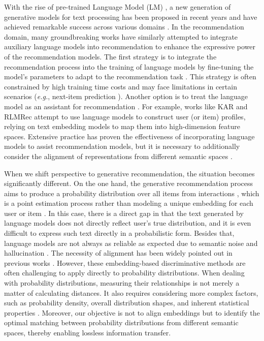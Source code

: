 \documentclass[sigconf]{acmart}
\begin{document}
With the rise of pre-trained Language Model (LM) \cite{touvron2023llama, zhao2023survey}, a new generation of generative models for text processing has been proposed in recent years and have achieved remarkable success across various domains \cite{chang2024survey}. In the recommendation domain, many groundbreaking works have similarly attempted to integrate auxiliary language models into recommendation to enhance the expressive power of the recommendation models. The first strategy is to integrate the recommendation process into the training of language models by fine-tuning the model's parameters \cite{liao2024llara, zhao2023survey} to adapt to the recommendation task \cite{geng2022recommendation, bao2023tallrec}. This strategy is often constrained by high training time costs \cite{ren2024representation} and may face limitations in certain scenarios \cite{liao2024llara} (\textit{e.g.}, next-item prediction \cite{kang2018self}). Another option is to treat the language model as an assistant for recommendation \cite{yuan2024fellas}. For example, works like KAR \cite{xi2024towards} and RLMRec \cite{ren2024representation} attempt to use language models to construct user (or item) profiles, relying on text embedding models \cite{neelakantan2022text} to map them into high-dimension feature spaces. Extensive practice \cite{xi2024towards, wei2024llmrec, ren2024representation} has proven the effectiveness of incorporating language models to assist recommendation models, but it is necessary to additionally consider the alignment of representations from different semantic spaces \cite{radford2021learning, ren2024representation}.

When we shift perspective to generative recommendation, the situation becomes significantly different. On the one hand, the generative recommendation process aims to produce a probability distribution over all items from interactions \cite{liang2018variational}, which is a point estimation process rather than modeling a unique embedding for each user or item \cite{he2020lightgcn}. In this case, there is a direct gap in that the text generated by language models does not directly reflect user's true distribution, and it is even difficult to express such text directly in a probabilistic form. Besides that, language models are not always as reliable as expected due to semantic noise \cite{wei2024llmrec} and hallucination \cite{ji2023survey}. The necessity of alignment has been widely pointed out in previous works \cite{radford2021learning, ren2024representation}. However, these embedding-based discriminative methods are often challenging to apply directly to probability distributions. When dealing with probability distributions, measuring their relationships is not merely a matter of calculating distances. It also requires considering more complex factors, such as probability density, overall distribution shapes, and inherent statistical properties \cite{xu2020learning, liu2022exploiting}. Moreover, our objective is not to align embeddings but to identify the optimal matching between probability distributions from different semantic spaces, thereby enabling lossless information transfer. 
\end{document}
